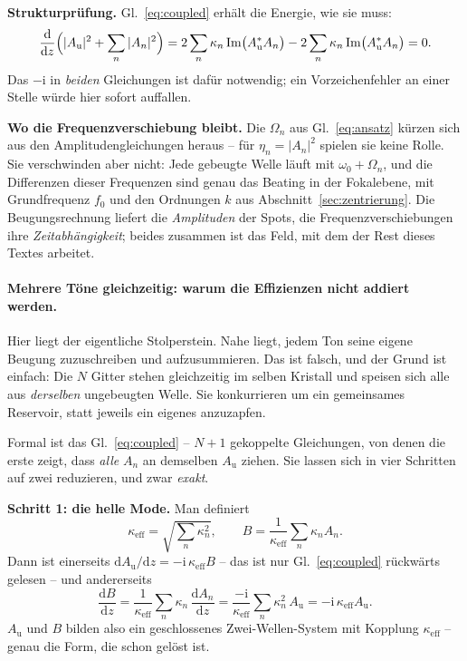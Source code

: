 \documentclass[11pt,a4paper]{article}
\begin{document}
\medskip
\noindent\textbf{Strukturprüfung.} Gl.~\eqref{eq:coupled} erhält die
Energie, wie sie muss:
\begin{equation}
  \frac{\mathrm{d}}{\mathrm{d}z}\Bigl(|A_\mathrm{u}|^2+\sum_n|A_n|^2\Bigr)
  = 2\sum_n \kappa_n\,\mathrm{Im}\bigl(A_\mathrm{u}^{*}A_n\bigr)
    - 2\sum_n \kappa_n\,\mathrm{Im}\bigl(A_\mathrm{u}^{*}A_n\bigr) = 0 .
\end{equation}
Das $-\mathrm{i}$ in \emph{beiden} Gleichungen ist dafür notwendig; ein
Vorzeichenfehler an einer Stelle würde hier sofort auffallen.

\medskip
\noindent\textbf{Wo die Frequenzverschiebung bleibt.} Die
$\Omega_n$ aus Gl.~\eqref{eq:ansatz} kürzen sich aus den
Amplitudengleichungen heraus -- für $\eta_n = |A_n|^2$ spielen sie keine
Rolle. Sie verschwinden aber nicht: Jede gebeugte Welle läuft mit
$\omega_0+\Omega_n$, und die Differenzen dieser Frequenzen sind genau das
Beating in der Fokalebene, mit Grundfrequenz $f_0$ und den Ordnungen $k$ aus
Abschnitt~\ref{sec:zentrierung}. Die Beugungsrechnung liefert die
\emph{Amplituden} der Spots, die Frequenzverschiebungen ihre
\emph{Zeitabhängigkeit}; beides zusammen ist das Feld, mit dem der Rest
dieses Textes arbeitet.

\paragraph{Mehrere Töne gleichzeitig: warum die Effizienzen nicht addiert werden.}
Hier liegt der eigentliche Stolperstein. Nahe liegt, jedem Ton seine eigene
Beugung zuzuschreiben und aufzusummieren. Das ist falsch, und der Grund ist
einfach: Die $N$ Gitter stehen gleichzeitig im selben Kristall und speisen
sich alle aus \emph{derselben} ungebeugten Welle. Sie konkurrieren um ein
gemeinsames Reservoir, statt jeweils ein eigenes anzuzapfen.

Formal ist das Gl.~\eqref{eq:coupled} -- $N+1$ gekoppelte Gleichungen, von
denen die erste zeigt, dass \emph{alle} $A_n$ an demselben $A_\mathrm{u}$ ziehen. Sie lassen sich in vier Schritten auf
zwei reduzieren, und zwar \emph{exakt}.

\medskip
\noindent\textbf{Schritt 1: die helle Mode.} Man definiert
\begin{equation}
  \kappa_\mathrm{eff} = \sqrt{\textstyle\sum_n \kappa_n^{2}} ,
  \qquad
  B = \frac{1}{\kappa_\mathrm{eff}}\sum_n \kappa_n A_n .
  \label{eq:brightmode}
\end{equation}
Dann ist einerseits $\mathrm{d}A_\mathrm{u}/\mathrm{d}z = -\mathrm{i}\,\kappa_\mathrm{eff}B$
-- das ist nur Gl.~\eqref{eq:coupled} rückwärts gelesen -- und andererseits
\begin{equation}
  \frac{\mathrm{d}B}{\mathrm{d}z}
  = \frac{1}{\kappa_\mathrm{eff}}\sum_n \kappa_n\,\frac{\mathrm{d}A_n}{\mathrm{d}z}
  = \frac{-\mathrm{i}}{\kappa_\mathrm{eff}}\sum_n \kappa_n^{2}\,A_\mathrm{u}
  = -\mathrm{i}\,\kappa_\mathrm{eff}A_\mathrm{u} .
\end{equation}
$A_\mathrm{u}$ und $B$ bilden also ein geschlossenes Zwei-Wellen-System mit
Kopplung $\kappa_\mathrm{eff}$ -- genau die Form, die schon gelöst ist.
\end{document}

